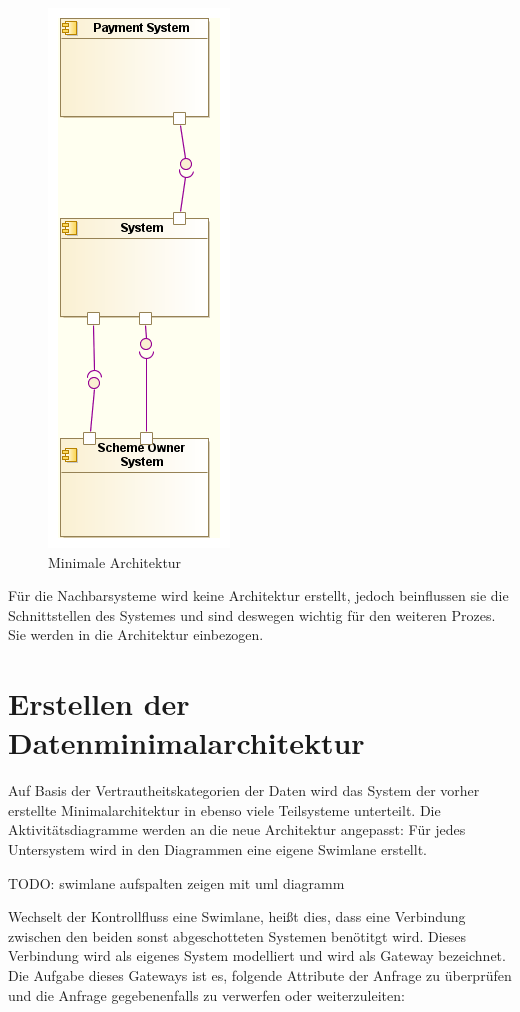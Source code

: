 \begin{figure}[H]
    \centering
    \includegraphics[scale=0.5]{uml/minimalarch.png}
    \caption{Minimale Architektur}
\end{figure}

Für die Nachbarsysteme wird keine Architektur erstellt, jedoch beinflussen sie die Schnittstellen des Systemes und sind deswegen wichtig für den weiteren Prozes. Sie werden in die Architektur einbezogen.

\section{Erstellen der Datenminimalarchitektur}
Auf Basis der Vertrautheitskategorien der Daten wird das System der vorher erstellte Minimalarchitektur in ebenso viele Teilsysteme unterteilt. Die Aktivitätsdiagramme werden an die neue Architektur angepasst: Für jedes Untersystem wird in den Diagrammen eine eigene Swimlane erstellt.

TODO: swimlane aufspalten zeigen mit uml diagramm

Wechselt der Kontrollfluss eine Swimlane, heißt dies, dass eine Verbindung zwischen den beiden sonst abgeschotteten Systemen benötitgt wird. Dieses Verbindung wird als eigenes System modelliert und wird als Gateway bezeichnet. Die Aufgabe dieses Gateways ist es, folgende Attribute der Anfrage zu überprüfen und die Anfrage gegebenenfalls zu verwerfen oder weiterzuleiten:

